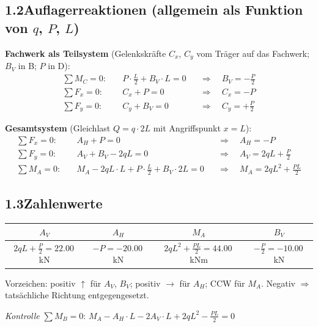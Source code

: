 \documentclass[a4paper,11pt]{article}
\begin{document}
\subsection*{1.2\quad Auflagerreaktionen (allgemein als Funktion von $q$, $P$, $L$)}

\textbf{Fachwerk als Teilsystem}
(Gelenkskräfte $C_x$, $C_y$ vom Träger auf das Fachwerk; $B_V$ in B; $P$ in D):
\begin{align*}
  \sum M_C = 0:\quad & P \cdot \tfrac{L}{2} + B_V \cdot L = 0
    &&\Rightarrow\quad \boxed{B_V = -\tfrac{P}{2}} \\
  \sum F_x = 0:\quad & C_x + P = 0
    &&\Rightarrow\quad C_x = -P \\
  \sum F_y = 0:\quad & C_y + B_V = 0
    &&\Rightarrow\quad C_y = +\tfrac{P}{2}
\end{align*}

\textbf{Gesamtsystem} (Gleichlast $Q = q \cdot 2L$ mit Angriffspunkt $x = L$):
\begin{align*}
  \sum F_x = 0:\quad & A_H + P = 0
    &&\Rightarrow\quad \boxed{A_H = -P} \\
  \sum F_y = 0:\quad & A_V + B_V - 2qL = 0
    &&\Rightarrow\quad \boxed{A_V = 2qL + \tfrac{P}{2}} \\
  \sum M_A = 0:\quad & M_A - 2qL \cdot L + P\cdot\tfrac{L}{2} + B_V \cdot 2L = 0
    &&\Rightarrow\quad \boxed{M_A = 2qL^2 + \tfrac{PL}{2}}
\end{align*}

\subsection*{1.3\quad Zahlenwerte}

\begin{center}
\begin{tabular}{cccc}
\toprule
$A_V$ & $A_H$ & $M_A$ & $B_V$ \\
\midrule
$2qL + \tfrac{P}{2} = \mathbf{22.00}$\,kN
& $-P = \mathbf{-20.00}$\,kN
& $2qL^2 + \tfrac{PL}{2} = \mathbf{44.00}$\,kNm
& $-\tfrac{P}{2} = \mathbf{-10.00}$\,kN \\
\bottomrule
\end{tabular}
\end{center}

Vorzeichen: positiv $\uparrow$ für $A_V$, $B_V$; positiv $\rightarrow$ für $A_H$;
CCW für $M_A$. Negativ $\Rightarrow$ tatsächliche Richtung entgegengesetzt.

\textit{Kontrolle} $\sum M_B = 0$:
$M_A - A_H \cdot L - 2A_V \cdot L + 2qL^2 - \tfrac{PL}{2} = 0$\;
\checkmark
\end{document}
